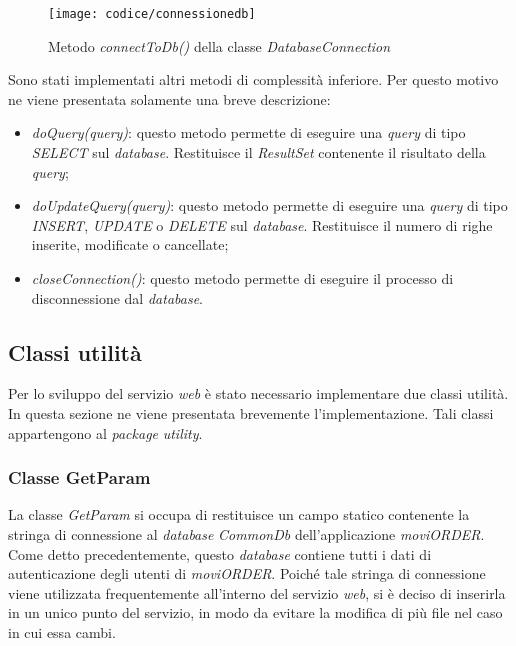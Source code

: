\begin{figure}[!h] 
    \centering 
    \texttt{[image: codice/connessionedb]} 
    \caption{Metodo \textit{connectToDb()} della classe \textit{DatabaseConnection}}
\end{figure}


Sono stati implementati altri metodi di complessità inferiore. Per questo motivo ne viene presentata solamente una breve descrizione:
\begin{itemize}
	\item \textit{doQuery(query)}: questo metodo permette di eseguire una \textit{query} di tipo \textit{SELECT} sul \textit{database}. Restituisce il \textit{ResultSet} contenente il risultato della \textit{query};
	\item \textit{doUpdateQuery(query)}: questo metodo permette di eseguire una \textit{query} di tipo \textit{INSERT}, \textit{UPDATE} o \textit{DELETE} sul \textit{database}. Restituisce il numero di righe inserite, modificate o cancellate;
	\item \textit{closeConnection()}: questo metodo permette di eseguire il processo di disconnessione dal \textit{database}.
\end{itemize}

\subsection{Classi utilità}

Per lo sviluppo del servizio \textit{web} è stato necessario implementare due classi utilità. In questa sezione ne viene presentata brevemente l'implementazione. Tali classi appartengono al \textit{package} \textit{utility}.

\subsubsection{Classe GetParam}

La classe \textit{GetParam} si occupa di restituisce un campo statico contenente la stringa di connessione al \textit{database} \textit{CommonDb} dell'applicazione \textit{moviORDER}. Come detto precedentemente, questo \textit{database} contiene tutti i dati di autenticazione degli utenti di \textit{moviORDER}. Poiché tale stringa di connessione viene utilizzata frequentemente all'interno del servizio \textit{web}, si è deciso di inserirla in un unico punto del servizio, in modo da evitare la modifica di più file nel caso in cui essa cambi.

